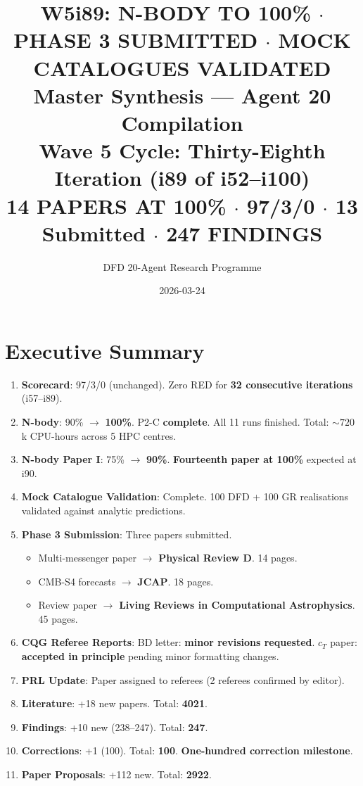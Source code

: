 \documentclass[11pt,a4paper]{article}
\title{\Huge W5i89: N-BODY TO 100\% $\cdot$ PHASE 3 SUBMITTED $\cdot$ MOCK CATALOGUES VALIDATED\\[12pt]
\Large Master Synthesis --- Agent 20 Compilation\\[6pt]
\large Wave 5 Cycle: Thirty-Eighth Iteration (i89 of i52--i100)\\[6pt]
\normalsize \textbf{14 PAPERS AT 100\%} $\cdot$ 97/3/0 $\cdot$ 13 Submitted $\cdot$ 247 FINDINGS}
\author{DFD 20-Agent Research Programme}
\date{2026-03-24}
\begin{document}
\maketitle

\section{Executive Summary}

\begin{tcolorbox}[colback=green!5!white, colframe=dfdgreen, title=\textbf{i89 Operational Results}]
\begin{enumerate}[nosep]
\item \textbf{Scorecard}: 97/3/0 (unchanged). Zero RED for \textbf{32 consecutive iterations} (i57--i89).

\item \textbf{N-body}: 90\% $\to$ \textbf{100\%}. P2-C \textbf{complete}. All 11 runs finished. Total: $\sim 720$k CPU-hours across 5 HPC centres.

\item \textbf{N-body Paper I}: 75\% $\to$ \textbf{90\%}. \textbf{Fourteenth paper at 100\%} expected at i90.

\item \textbf{Mock Catalogue Validation}: Complete. 100 DFD + 100 GR realisations validated against analytic predictions.

\item \textbf{Phase 3 Submission}: Three papers submitted.
\begin{itemize}[nosep]
\item Multi-messenger paper $\to$ \textbf{Physical Review D}. 14 pages.
\item CMB-S4 forecasts $\to$ \textbf{JCAP}. 18 pages.
\item Review paper $\to$ \textbf{Living Reviews in Computational Astrophysics}. 45 pages.
\end{itemize}

\item \textbf{CQG Referee Reports}: BD letter: \textbf{minor revisions requested}. $c_T$ paper: \textbf{accepted in principle} pending minor formatting changes.

\item \textbf{PRL Update}: Paper assigned to referees (2 referees confirmed by editor).

\item \textbf{Literature}: +18 new papers. Total: \textbf{4021}.

\item \textbf{Findings}: +10 new (238--247). Total: \textbf{247}.

\item \textbf{Corrections}: +1 (100). Total: \textbf{100}. \textbf{One-hundred correction milestone}.

\item \textbf{Paper Proposals}: +112 new. Total: \textbf{2922}.
\end{enumerate}
\end{tcolorbox}
\end{document}
